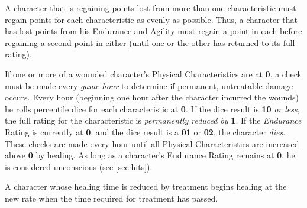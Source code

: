A character that is regaining points lost from more than one
characteristic must regain points for each characteristic as evenly as
possible.  Thus, a character that has lost points from his Endurance
and Agility must regain a point in each before regaining a second
point in either (until one or the other has returned to its full
rating).

If one or more of a wounded character's Physical Characteristics are
at \textbf{0}, a check must be made every \emph{game hour} to
determine if permanent, untreatable damage occurs.  Every hour
(beginning one hour after the character incurred the wounds) he rolls
percentile dice for each characteristic at \textbf{0}.  If the dice
result is \textbf{10} \emph{or less}, the full rating for the
characteristic is \emph{permanently reduced by} \textbf{1}.  If the
\emph{Endurance} Rating is currently at \textbf{0}, and the dice
result is a \textbf{01} or \textbf{02}, the character \emph{dies}.
These checks are made every hour until all Physical Characteristics
are increased above \textbf{0} by healing.  As long as a character's
Endurance Rating remains at \textbf{0}, he is considered unconscious
(see \ref{sec:hits}).

A character whose healing time is reduced by treatment begins healing
at the new rate when the time required for treatment has passed.

\begin{table}[htbp]
  \centering
\end{table}

